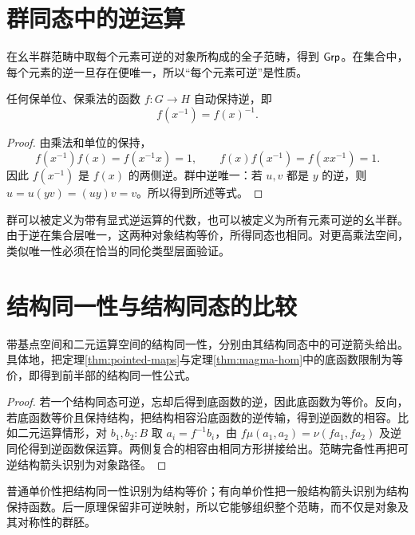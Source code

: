 \section{群同态中的逆运算}
\begin{definition}[群范畴]
在幺半群范畴中取每个元素可逆的对象所构成的全子范畴，得到 $\mathsf{Grp}$。在集合中，每个元素的逆一旦存在便唯一，所以“每个元素可逆”是性质。
\end{definition}
\begin{proposition}
任何保单位、保乘法的函数 $f:G\to H$ 自动保持逆，即
\[
f(x^{-1})=f(x)^{-1}.
\]
\end{proposition}
\begin{proof}
由乘法和单位的保持，
\[
f(x^{-1})f(x)=f(x^{-1}x)=1,
\qquad
f(x)f(x^{-1})=f(xx^{-1})=1.
\]
因此 $f(x^{-1})$ 是 $f(x)$ 的两侧逆。群中逆唯一：若 $u,v$ 都是 $y$ 的逆，则 $u=u(yv)=(uy)v=v$。所以得到所述等式。
\end{proof}
\begin{remark}
群可以被定义为带有显式逆运算的代数，也可以被定义为所有元素可逆的幺半群。由于逆在集合层唯一，这两种对象结构等价，所得同态也相同。对更高乘法空间，类似唯一性必须在恰当的同伦类型层面验证。
\end{remark}

\section{结构同一性与结构同态的比较}
\begin{proposition}
带基点空间和二元运算空间的结构同一性，分别由其结构同态中的可逆箭头给出。具体地，把定理\ref{thm:pointed-maps}与定理\ref{thm:magma-hom}中的底函数限制为等价，即得到前半部的结构同一性公式。
\end{proposition}
\begin{proof}
若一个结构同态可逆，忘却后得到底函数的逆，因此底函数为等价。反向，若底函数等价且保持结构，把结构相容沿底函数的逆传输，得到逆函数的相容。比如二元运算情形，对 $b_1,b_2:B$ 取 $a_i=f^{-1}b_i$，由 $f\mu(a_1,a_2)=\nu(fa_1,fa_2)$ 及逆同伦得到逆函数保运算。两侧复合的相容由相同方形拼接给出。范畴完备性再把可逆结构箭头识别为对象路径。
\end{proof}
\begin{remark}
普通单价性把结构同一性识别为结构等价；有向单价性把一般结构箭头识别为结构保持函数。后一原理保留非可逆映射，所以它能够组织整个范畴，而不仅是对象及其对称性的群胚。
\end{remark}

